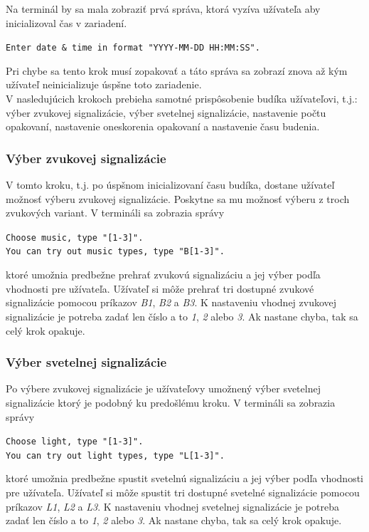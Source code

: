 \documentclass[11pt,a4paper]{article}
\begin{document}
        \indent Na terminál by sa mala zobraziť prvá správa, ktorá vyzíva užívateľa aby inicializoval čas v zariadení. 
        \begin{center}
            \texttt{Enter date \& time in format "YYYY-MM-DD HH:MM:SS".}
        \end{center}
        Pri chybe sa tento krok musí zopakovať a táto správa sa zobrazí znova až kým užívateľ neinicializuje úspšne toto zariadenie.\\

        \indent V nasledujúcich krokoch prebieha samotné prispôsobenie budíka užívateľovi, t.j.: výber zvukovej signalizácie, výber svetelnej signalizácie, nastavenie počtu opakovaní, nastavenie oneskorenia opakovaní a nastavenie času budenia.

        \subsubsection{Výber zvukovej signalizácie}

            \indent V tomto kroku, t.j. po úspšnom inicializovaní času budíka, dostane užívateľ možnosť výberu zvukovej signalizácie. Poskytne sa mu možnosť výberu z troch zvukových variant. V termináli sa zobrazia správy
            \begin{center}
                \texttt{Choose music, type "[1-3]".}\\
                \texttt{You can try out music types, type "B[1-3]".}
            \end{center}
            ktoré umožnia predbežne prehrať zvukovú signalizáciu a jej výber podľa vhodnosti pre užívateľa. Užívateľ si môže prehrať tri dostupné zvukové signalizácie pomocou príkazov \textit{B1}, \textit{B2} a \textit{B3}. K nastaveniu vhodnej zvukovej signalizácie je potreba zadať len číslo a to \textit{1}, \textit{2} alebo \textit{3}. Ak nastane chyba, tak sa celý krok opakuje.

        \subsubsection{Výber svetelnej signalizácie}

            \indent Po výbere zvukovej signalizácie je užívateľovy umožnený výber svetelnej signalizácie ktorý je podobný ku predošlému kroku. V termináli sa zobrazia správy
            \begin{center}
                \texttt{Choose light, type "[1-3]".}\\
                \texttt{You can try out light types, type "L[1-3]".}
            \end{center}
            ktoré umožnia predbežne spustit svetelnú signalizáciu a jej výber podľa vhodnosti pre užívateľa. Užívateľ si môže spustit tri dostupné svetelné signalizácie pomocou príkazov \textit{L1}, \textit{L2} a \textit{L3}. K nastaveniu vhodnej svetelnej signalizácie je potreba zadať len číslo a to \textit{1}, \textit{2} alebo \textit{3}. Ak nastane chyba, tak sa celý krok opakuje.
\end{document}
